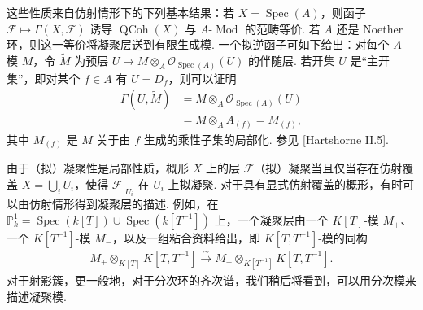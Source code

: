 这些性质来自仿射情形下的下列基本结果：若 $X=\operatorname{Spec}(A)$，则函子 $\mathcal F\mapsto\Gamma(X,\mathcal F)$ 诱导 $\operatorname{QCoh}(X)$ 与 $A\text{-}\operatorname{Mod}$ 的范畴等价. 若 $A$ 还是 Noether 环，则这一等价将凝聚层送到有限生成模. 一个拟逆函子可如下给出：对每个 $A$-模 $M$，令 $\widetilde M$ 为预层 $U\mapsto M\otimes_A\mathcal O_{\operatorname{Spec}(A)}(U)$ 的伴随层. 若开集 $U$ 是``主开集''，即对某个 $f\in A$ 有 $U=D_f$，则可以证明
\begin{align*}
\Gamma(U,\widetilde M)&=M\otimes_A\mathcal O_{\operatorname{Spec}(A)}(U)\\
&=M\otimes_A A_{(f)}=M_{(f)},
\end{align*}
其中 $M_{(f)}$ 是 $M$ 关于由 $f$ 生成的乘性子集的局部化. 参见 [Hartshorne II.5].

由于（拟）凝聚性是局部性质，概形 $X$ 上的层 $\mathcal F$（拟）凝聚当且仅当存在仿射覆盖 $X=\bigcup_iU_i$，使得 $\mathcal F|_{U_i}$ 在 $U_i$ 上拟凝聚. 对于具有显式仿射覆盖的概形，有时可以由仿射情形得到凝聚层的描述. 例如，在 $\mathbb P_k^1=\operatorname{Spec}(k[T])\cup\operatorname{Spec}(k[T^{-1}])$ 上，一个凝聚层由一个 $K[T]$-模 $M_+$、一个 $K[T^{-1}]$-模 $M_-$，以及一组粘合资料给出，即 $K[T,T^{-1}]$-模的同构
\begin{align*}
M_+\otimes_{K[T]}K[T,T^{-1}]\xrightarrow{\sim}M_-\otimes_{K[T^{-1}]}K[T,T^{-1}].
\end{align*}
对于射影簇，更一般地，对于分次环的齐次谱，我们稍后将看到，可以用分次模来描述凝聚模.

